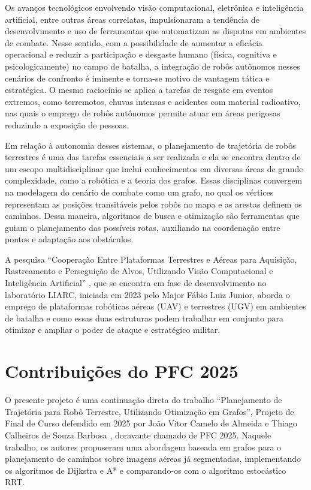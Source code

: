 \documentclass[
    12pt,
    openright,
    oneside,
    a4paper,
    english,
    brazil
]{abntex2}
\begin{document}
Os avanços tecnológicos envolvendo visão computacional, eletrônica e inteligência artificial, entre outras áreas correlatas, impulsionaram a tendência de desenvolvimento e uso de ferramentas que automatizam as disputas em ambientes de combate. Nesse sentido, com a possibilidade de aumentar a eficácia operacional e reduzir a participação e desgaste humano (física, cognitiva e psicologicamente) no campo de batalha, a integração de robôs autônomos nesses cenários de confronto é iminente e torna-se motivo de vantagem tática e estratégica. O mesmo raciocínio se aplica a tarefas de resgate em eventos extremos, como terremotos, chuvas intensas e acidentes com material radioativo, nas quais o emprego de robôs autônomos permite atuar em áreas perigosas reduzindo a exposição de pessoas.

Em relação à autonomia desses sistemas, o planejamento de trajetória de robôs terrestres é uma das tarefas essenciais a ser realizada e ela se encontra dentro de um escopo multidisciplinar que inclui conhecimentos em diversas áreas de grande complexidade, como a robótica e a teoria dos grafos. Essas disciplinas convergem na modelagem do cenário de combate como um grafo, no qual os vértices representam as posições transitáveis pelos robôs no mapa e as arestas definem os caminhos. Dessa maneira, algoritmos de busca e otimização são ferramentas que guiam o planejamento das possíveis rotas, auxiliando na coordenação entre pontos e adaptação aos obstáculos.

A pesquisa ``Cooperação Entre Plataformas Terrestres e Aéreas para Aquisição, Rastreamento e Perseguição de Alvos, Utilizando Visão Computacional e Inteligência Artificial'' \cite{junior2024}, que se encontra em fase de desenvolvimento no laboratório LIARC, iniciada em 2023 pelo Major Fábio Luiz Junior, aborda o emprego de plataformas robóticas aéreas (UAV) e terrestres (UGV) em ambientes de batalha e como essas duas estruturas podem trabalhar em conjunto para otimizar e ampliar o poder de ataque e estratégico militar.

\section{Contribuições do PFC 2025}
\label{sec:pfc2025}

O presente projeto é uma continuação direta do trabalho ``Planejamento de Trajetória para Robô Terrestre, Utilizando Otimização em Grafos'', Projeto de Final de Curso defendido em 2025 por João Vitor Camelo de Almeida e Thiago Calheiros de Souza Barbosa \cite{camelo2025}, doravante chamado de PFC 2025. Naquele trabalho, os autores propuseram uma abordagem baseada em grafos para o planejamento de caminhos sobre imagens aéreas já segmentadas, implementando os algoritmos de Dijkstra e A* e comparando-os com o algoritmo estocástico RRT.
\end{document}

